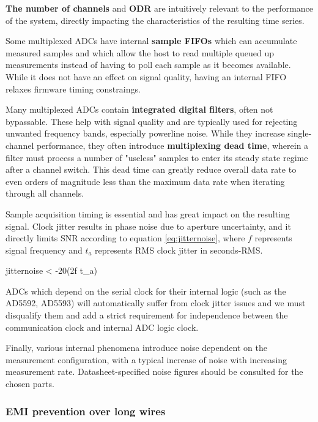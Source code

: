 \documentclass{thesis}
\begin{document}
\textbf{The number of channels} and \textbf{ODR} are intuitively relevant to the performance of the system, directly impacting the characteristics of the resulting time series.

Some multiplexed ADCs have internal \textbf{sample FIFOs} which can accumulate measured samples and which allow the host to read multiple queued up measurements instead of having to poll each sample as it becomes available. While it does not have an effect on signal quality, having an internal FIFO relaxes firmware timing constraings.

Many multiplexed ADCs contain \textbf{integrated digital filters}, often not bypassable. These help with signal quality and are typically used for rejecting unwanted frequency bands, especially powerline noise. While they increase single-channel performance, they often introduce \textbf{multiplexing dead time}, wherein a filter must process a number of "useless" samples to enter its steady state regime after a channel switch. This dead time can greatly reduce overall data rate to even orders of magnitude less than the maximum data rate when iterating through all channels.

Sample acquisition timing is essential and has great impact on the resulting signal. Clock jitter results in phase noise due to aperture uncertainty, and it directly limits SNR according to equation \ref{eq:jitternoise}\cite{AN-501}, where $f$ represents signal frequency and $t_a$ represents RMS clock jitter in seconds-RMS.

\begin{thesisequation}{jitternoise}
 < -20\log(2\pi f t_a)
\end{thesisequation}

ADCs which depend on the serial clock for their internal logic (such as the AD5592, AD5593) will automatically suffer from clock jitter issues and we must disqualify them and add a strict requirement for independence between the communication clock and internal ADC logic clock.

Finally, various internal phenomena introduce noise dependent on the measurement configuration, with a typical increase of noise with increasing measurement rate. Datasheet-specified noise figures should be consulted for the chosen parts.

\subsubsection{EMI prevention over long wires}
\end{document}
